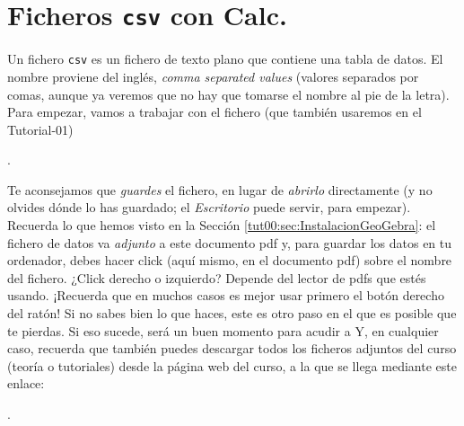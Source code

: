 \documentclass[10pt,a4paper]{article}
\newcounter {cont01}
\begin{document}
\section{Ficheros {\tt csv} con Calc.}
\label{tut00:sec:FicherosCsvConCalc}

Un fichero {\tt csv} es un fichero de texto plano que contiene una tabla de datos. El nombre
proviene del inglés, {\em comma separated values} (valores separados por comas, aunque ya veremos
que no hay que tomarse el nombre al pie de la letra).  Para empezar, vamos a trabajar con el
fichero (que también usaremos en el Tutorial-01)
\begin{center}
.
\end{center}
Te aconsejamos que {\em guardes} el fichero, en lugar de {\em abrirlo} directamente (y no olvides
dónde lo has guardado; el {\em Escritorio} puede servir, para empezar). Recuerda lo que hemos
visto en la Sección \ref{tut00:sec:InstalacionGeoGebra}: el fichero de datos va {\em adjunto} a
este documento pdf y, para guardar los datos en tu ordenador, debes hacer click (aquí mismo, en el
documento pdf) sobre el nombre del fichero. ¿Click derecho o izquierdo? Depende del lector de pdfs
que estés usando. ¡Recuerda que en muchos casos es mejor usar primero el botón derecho del ratón!
Si no sabes bien lo que haces, este es otro paso en el que es posible que te pierdas. Si eso
sucede, será un buen momento para acudir a  Y, en cualquier caso, recuerda
que también puedes descargar todos los ficheros adjuntos del curso (teoría o tutoriales) desde la
página web del curso, a la que se llega mediante este enlace:
\begin{center}
.
\end{center}
\end{document}
